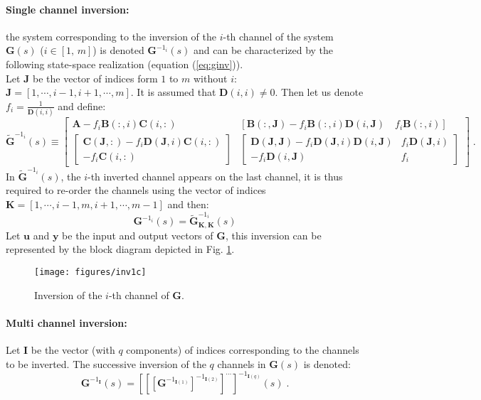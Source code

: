 \paragraph{Single channel inversion:} the system corresponding to the inversion of the $i$-th channel of the system $\mathbf{G}(s)$ ($i\in[1,\,m]$) is denoted $\mathbf{G}^{-1_i}(s)$ and can be characterized by the following state-space realization (equation (\ref{eq:ginv})).\\
Let $\mathbf{J}$ be the vector of indices form $1$ to $m$ without $i$: $\mathbf{J}=[1,\cdots,i-1,i+1,\cdots,m]$. It is assumed that $\mathbf{D}(i,i)\neq 0$. Then let us denote $f_i=\frac{1}{\mathbf{D}(i,i)}$  and define:
\[
\widetilde{\mathbf{G}}^{-1_i}(s) \equiv \left[\begin{array}{c|c}\mathbf{A}-f_i\mathbf{B}(:,i)\mathbf{C}(i,:) & [\mathbf{B}(:,\mathbf{J})-f_i\mathbf{B}(:,i)\mathbf{D}(i,\mathbf{J})\quad f_i\mathbf{B}(:,i)] \\ \hline \left[\begin{array}{c}  \mathbf{C}(\mathbf{J},:)-f_i\mathbf{D}(\mathbf{J},i)\mathbf{C}(i,:)\\-f_i\mathbf{C}(i,:)  \end{array}\right] & \left[\begin{array}{cc}\mathbf{D(\mathbf{J},\mathbf{J})}-f_i\mathbf{D}(\mathbf{J},i)\mathbf{D}(i,\mathbf{J}) & f_i\mathbf{D}(\mathbf{J},i)\\
-f_i\mathbf{D}(i,\mathbf{J}) & f_i
\end{array}\right]\end{array}\right]\;.
\]
In $\widetilde{\mathbf{G}}^{-1_i}(s)$, the $i$-th inverted channel appears on the last channel, it is  thus required to re-order the channels using the vector of indices $\mathbf{K}=[1,\cdots,i-1,m, i+1,\cdots,m-1]$ and then:
\begin{equation}\label{eq:ginv}
\mathbf{G}^{-1_i}(s)=\widetilde{\mathbf{G}}^{-1_i}_{\mathbf{K},\mathbf{K}}(s)
\end{equation}
Let $\mathbf{u}$ and $\mathbf{y}$ be the input and output vectors of $\mathbf{G}$, this inversion can be represented by the block diagram depicted in Fig. \ref{fig:inv1c}.
\begin{figure}
  \texttt{[image: figures/inv1c]}
\caption{Inversion of the $i$-th channel of $\mathbf{G}$.}
\label{fig:inv1c} 
\end{figure}


\paragraph{Multi channel inversion:} Let $\mathbf{I}$ be the vector (with $q$ components) of indices corresponding to the channels to be inverted. The successive inversion of the $q$ channels in $\mathbf{G}(s)$ is denoted:
\begin{equation}
\mathbf{G}^{-1_{\mathbf{I}}}(s)=\left[\left[\left[\mathbf{G}^{-1_{\mathbf{I}(1)}}\right]^{-1_{\mathbf{I}(2)}}\right]^{\cdots}\right]^{-1_{\mathbf{I}(q)}}(s)\;.
\end{equation}


